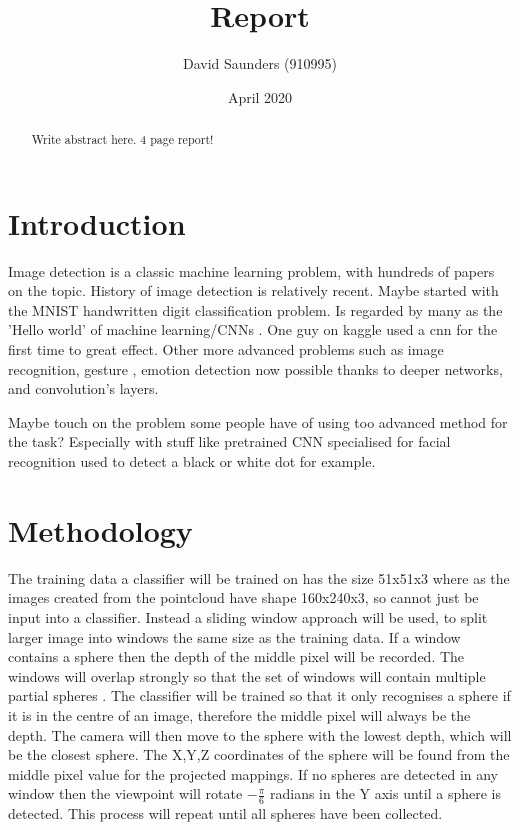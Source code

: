 \documentclass{article}
\title{Report}
\author{David Saunders (910995)}
\date{April 2020}
\begin{document}
\maketitle

\begin{abstract} 
    Write abstract here. 4 page report!
\end{abstract}

\tableofcontents

\section{Introduction}

Image detection is a classic machine learning problem, with hundreds of papers on the topic. 
History of image detection is relatively recent.
Maybe started with the MNIST handwritten digit classification problem.
Is regarded by many as the 'Hello world' of machine learning/CNNs \cite{tensorflow_2020}.
One guy on kaggle used a cnn for the first time to great effect.
Other more advanced problems such as image recognition, gesture
    , emotion detection now possible thanks to deeper networks, and convolution's layers.


Maybe touch on the problem some people have of using too advanced method for the task?
Especially with stuff like pretrained CNN specialised for facial recognition used to detect a black or white dot for example.


\section{Methodology}

The training data a classifier will be trained on has the size 51x51x3 where as the images created from the pointcloud have shape 160x240x3, so cannot just be input into a classifier.
Instead a sliding window approach will be used, to split larger image into windows the same size as the training data.   
If a window contains a sphere then the depth of the middle pixel will be recorded.
The windows will overlap strongly so that the set of windows will contain multiple partial spheres \cite{forsyth2002computer}.
The classifier will be trained so that it only recognises a sphere if it is in the centre of an image, therefore the middle pixel will always be the depth.
The camera will then move to the sphere with the lowest depth, which will be the closest sphere.
The X,Y,Z coordinates of the sphere will be found from the middle pixel value for the projected mappings.
If no spheres are detected in any window then the viewpoint will rotate $-\frac{\pi}{6}$ radians in the Y axis until a sphere is detected.
This process will repeat until all spheres have been collected.
\end{document}
